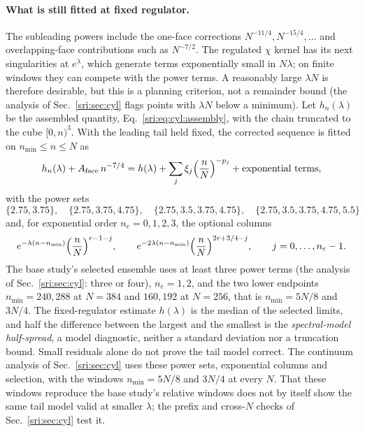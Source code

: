 \paragraph{What is still fitted at fixed regulator.} The subleading powers include the one-face corrections
$N^{-11/4},N^{-15/4},\ldots$ and overlapping-face contributions such as $N^{-7/2}$. The regulated $\chi$ kernel has its
next singularities at $e^{\lambda}$, which generate terms exponentially small in $N\lambda$; on finite windows they can
compete with the power terms. A reasonably large $\lambda N$ is therefore desirable, but this is a planning criterion,
not a remainder bound (the analysis of Sec.~\ref{sri:sec:cyl} flags points with $\lambda N$ below a minimum). Let $h_n(\lambda)$
be the assembled quantity, Eq.~\eqref{sri:eq:cyl:assembly}, with the chain truncated to the cube $[0,n)^3$. With the leading
tail held fixed, the corrected sequence is fitted on $n_{\min}\le n\le N$ as
\begin{equation}
 h_n(\lambda)+A_{\rm face}\,n^{-7/4}=h(\lambda)+\sum_j\xi_j\Bigl(\frac nN\Bigr)^{-p_j}+\text{exponential terms},
 \label{sri:eq:cyl:spectralfit}
\end{equation}
with the power sets
\begin{equation}
 \{2.75,3.75\},\quad\{2.75,3.75,4.75\},\quad\{2.75,3.5,3.75,4.75\},\quad\{2.75,3.5,3.75,4.75,5.5\}
\end{equation}
and, for exponential order $n_e=0,1,2,3$, the optional columns
\begin{equation}
 e^{-\lambda(n-n_{\min})}\Bigl(\frac nN\Bigr)^{r-1-j},\qquad e^{-2\lambda(n-n_{\min})}\Bigl(\frac nN\Bigr)^{2r+3/4-j},
 \qquad j=0,\ldots,n_e-1.
\end{equation}
The base study's selected ensemble uses at least three power terms (the analysis of Sec.~\ref{sri:sec:cyl}: three or
four), $n_e=1,2$, and the two lower endpoints $n_{\min}=240,288$ at $N=384$
and $160,192$ at $N=256$, that is $n_{\min}=5N/8$ and $3N/4$. The fixed-regulator estimate $h(\lambda)$ is the median
of the selected limits, and half the difference between the largest and the smallest is the \emph{spectral-model
half-spread}, a model diagnostic, neither a standard deviation nor a truncation bound. Small residuals alone do not
prove the tail model correct. The continuum analysis of Sec.~\ref{sri:sec:cyl} uses these power sets, exponential columns
and selection, with the windows $n_{\min}=5N/8$ and $3N/4$ at every $N$. That these windows reproduce the base
study's relative windows does not by itself show the same tail model valid at smaller $\lambda$; the prefix and
cross-$N$ checks of Sec.~\ref{sri:sec:cyl} test it.

